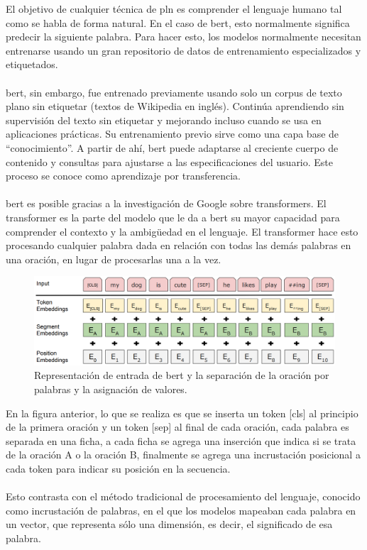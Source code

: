 \documentclass[12pt, a4paper, titlepage]{report}
\begin{document}
		        El objetivo de cualquier técnica de \acrshort{pln} es comprender el lenguaje humano tal como se habla de forma natural. En el caso de \acrshort{bert}, esto normalmente significa predecir la siguiente palabra. Para hacer esto, los modelos normalmente necesitan entrenarse usando un gran repositorio de datos de entrenamiento especializados y etiquetados.\\\\     
		        \acrshort{bert}, sin embargo, fue entrenado previamente usando solo un corpus de texto plano sin etiquetar (textos de Wikipedia en inglés). Continúa aprendiendo sin supervisión del texto sin etiquetar y mejorando incluso cuando se usa en aplicaciones prácticas. Su entrenamiento previo sirve como una capa base de “conocimiento”. A partir de ahí, \acrshort{bert} puede adaptarse al creciente cuerpo de contenido y consultas para ajustarse a las especificaciones del usuario. Este proceso se conoce como aprendizaje por transferencia.\\\\        
		        \acrshort{bert} es posible gracias a la investigación de Google sobre transformers. El transformer es la parte del modelo que le da a \acrshort{bert} su mayor capacidad para comprender el contexto y la ambigüedad en el lenguaje. El transformer hace esto procesando cualquier palabra dada en relación con todas las demás palabras en una oración, en lugar de procesarlas una a la vez.\par        
		        
		        \begin{figure}[H] \caption{Representación de entrada de \acrshort{bert} y la separación de la oración por palabras y la asignación de valores.\cite{refQueesBert}}
		        	\includegraphics[width=12cm]{./imagenes/MarcoTeorico/Bertprocess.png}
		        	\centering 
		        \end{figure} 
		           
		        En la figura anterior, lo que se realiza es que se inserta un token [\acrfull{cls}] al principio de la primera oración y un token [\acrfull{sep}] al final de cada oración, cada palabra es separada en una ficha, a cada ficha se agrega una inserción que indica si se trata de la oración A o la oración B, finalmente se agrega una incrustación posicional a cada token para indicar su posición en la secuencia. \cite{refComofuncionaBert}\\\\     
		        Esto contrasta con el método tradicional de procesamiento del lenguaje, conocido como incrustación de palabras, en el que los modelos mapeaban cada palabra en un vector, que representa sólo una dimensión, es decir, el significado de esa palabra.\par
		        
\end{document}
